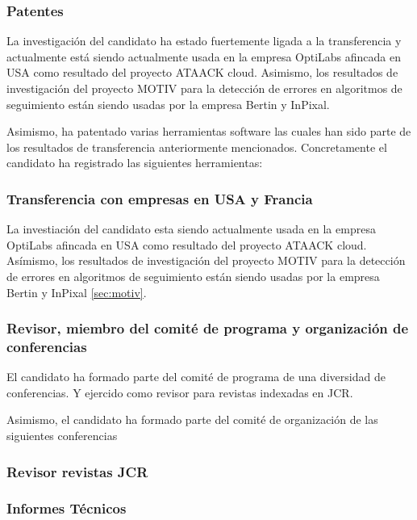 \subsubsection{Patentes}
La investigación del candidato ha estado fuertemente ligada a la transferencia y actualmente está siendo actualmente usada en la empresa OptiLabs afincada en USA como resultado del proyecto ATAACK cloud. Asimismo, los resultados de investigación del proyecto MOTIV para la detección de errores en algoritmos de seguimiento están siendo usadas por la empresa Bertin y InPixal.

Asimismo, ha patentado varias herramientas software las cuales han sido parte de los resultados de transferencia anteriormente mencionados.  Concretamente el candidato ha registrado las siguientes herramientas:\\



\subsubsection{Transferencia con empresas en USA y Francia}
La investiación del candidato esta siendo actualmente usada en la empresa OptiLabs afincada en USA como resultado del proyecto ATAACK cloud. Asímismo, los resultados de investigación del proyecto MOTIV para la detección de errores en algoritmos de seguimiento están siendo usadas por la empresa Bertin y InPixal \ref{sec:motiv}.


\subsubsection{Revisor, miembro del comité de programa y organización de conferencias}
El candidato ha formado parte del comité de programa de una diversidad de conferencias. Y ejercido como revisor para revistas indexadas en JCR. \\
\startitems
{}
\stopitems


Asimismo, el candidato ha formado parte del comité de organización de las siguientes conferencias\\
\startitems
{} 
\stopitems

\subsubsection{Revisor revistas JCR}

\subsubsection{Informes Técnicos}
